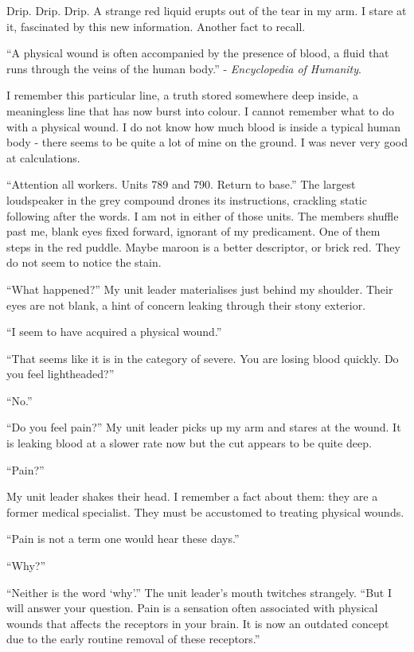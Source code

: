 Drip. Drip. Drip.
A strange red liquid erupts out of the tear in my arm. I stare at it, fascinated by this new information. Another fact to recall.

\hspace{1.5em}
\parbox{0.9\textwidth}{
“A physical wound is often accompanied by the presence of blood, a fluid that runs through the veins of the human body.” - \textit{Encyclopedia of Humanity}.
}

I remember this particular line, a truth stored somewhere deep inside, a meaningless line that has now burst into colour. 
I cannot remember what to do with a physical wound. I do not know how much blood is inside a typical human body - there seems to be quite a lot of mine on the ground. I was never very good at calculations. 

“Attention all workers. Units 789 and 790. Return to base.” The largest loudspeaker in the grey compound drones its instructions, crackling static following after the words.
I am not in either of those units. The members shuffle past me, blank eyes fixed forward, ignorant of my predicament. One of them steps in the red puddle. Maybe maroon is a better descriptor, or brick red. They do not seem to notice the stain. 

“What happened?” My unit leader materialises just behind my shoulder. Their eyes are not blank, a hint of concern leaking through their stony exterior.

“I seem to have acquired a physical wound.”

“That seems like it is in the category of severe. You are losing blood quickly. Do you feel lightheaded?”

“No.”

“Do you feel pain?” My unit leader picks up my arm and stares at the wound. It is leaking blood at a slower rate now but the cut appears to be quite deep.

“Pain?”

My unit leader shakes their head. I remember a fact about them: they are a former medical specialist. They must be accustomed to treating physical wounds.

“Pain is not a term one would hear these days.”

“Why?”

“Neither is the word ‘why’.” The unit leader’s mouth twitches strangely. “But I will answer your question. Pain is a sensation often associated with physical wounds that affects the receptors in your brain. It is now an outdated concept due to the early routine removal of these receptors.”

